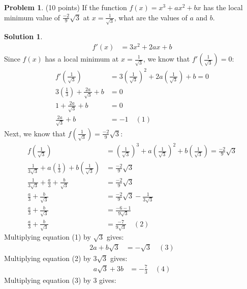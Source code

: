 \documentclass[11pt]{article}
\theoremstyle{definition}
\newtheorem{problem}{Problem}
\newtheorem*{solution}{Solution}
\begin{document}

\begin{problem}
(10 points) If the function $f(x) = x^3 + ax^2 + bx$ has the local minimum value of $\frac{-2}{9}\sqrt{3}$ at $x = \frac{1}{\sqrt{3}}$, 
what are the values of $a$ and $b$.
\end{problem}

\begin{solution}
    \begin{align}
        f'(x) &= 3x^2 + 2ax + b
    \end{align}
    Since $f(x)$ has a local minimum at $x = \frac{1}{\sqrt{3}}$, we know that $f'(\frac{1}{\sqrt{3}}) = 0$:
    \begin{align}
        f'(\frac{1}{\sqrt{3}}) &= 3(\frac{1}{\sqrt{3}})^2 + 2a(\frac{1}{\sqrt{3}}) + b = 0 \\
        3(\frac{1}{3}) + \frac{2a}{\sqrt{3}} + b &= 0 \\
        1 + \frac{2a}{\sqrt{3}} + b &= 0 \\
        \frac{2a}{\sqrt{3}} + b &= -1 \quad (1)
    \end{align}
    Next, we know that $f(\frac{1}{\sqrt{3}}) = \frac{-2}{9}\sqrt{3}$:
    \begin{align}
        f(\frac{1}{\sqrt{3}}) &= (\frac{1}{\sqrt{3}})^3 + a(\frac{1}{\sqrt{3}})^2 + b(\frac{1}{\sqrt{3}}) = \frac{-2}{9}\sqrt{3} \\
        \frac{1}{3\sqrt{3}} + a(\frac{1}{3}) + b(\frac{1}{\sqrt{3}}) &= \frac{-2}{9}\sqrt{3} \\
        \frac{1}{3\sqrt{3}} + \frac{a}{3} + \frac{b}{\sqrt{3}} &= \frac{-2}{9}\sqrt{3} \\
        \frac{a}{3} + \frac{b}{\sqrt{3}} &= \frac{-2}{9}\sqrt{3} - \frac{1}{3\sqrt{3}} \\
        \frac{a}{3} + \frac{b}{\sqrt{3}} &= \frac{-6 - 1}{9\sqrt{3}} \\
        \frac{a}{3} + \frac{b}{\sqrt{3}} &= \frac{-7}{9\sqrt{3}} \quad (2)
    \end{align}
    Multiplying equation (1) by $\sqrt{3}$ gives:
    \begin{align}
        2a + b\sqrt{3} &= -\sqrt{3} \quad (3)
    \end{align}
    Multiplying equation (2) by $3\sqrt{3}$ gives:
    \begin{align}
        a\sqrt{3} + 3b &= -\frac{7}{3} \quad (4)
    \end{align}
    Multiplying equation (3) by 3 gives:

\end{solution}
\end{document}
